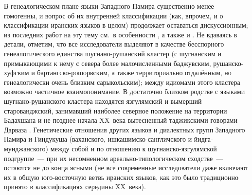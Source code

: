 В генеалогическом плане языки Западного Памира существенно менее гомогенны, и вопрос об их внутренней классификации (как, впрочем, и о классификации иранских языков в целом) продолжает оставаться дискуссионным; из последних работ на эту тему см.~в особенности \parencites{wendtland2009}{korn2016_tree}{korn2019}, а также \parencite{edelman_dodykhudoeva2009_shughni} и \parencite{edelman2021}. Не вдаваясь в детали, отметим, что все исследователи выделяют в качестве бесспорного генеалогического единства шугнано-рушанский кластер (с шугнанским и примыкающими к нему с севера более малочисленными баджувским, рушанско-хуфским и бартангско-рошорвским, а также территориально отдалённым, но генеалогически очень близким сарыкольским); между идиомами этого кластера возможно частичное взаимопонимание. В достаточно близком родстве с языками шугнано-рушанского кластера находятся язгулямский \parencite{sokolova1967} и вымерший старованджский, занимавший наиболее северное положение на территории Бадахшана и не позднее начала XX~века вытесненный таджикскими говорами Дарваза \parencite{lashkarbekov2008}. Генетические отношения других языков и диалектных групп Западного Памира и Гиндукуша (ваханского, ишкашимско-сангличского и йидга-мунджанского) между собой и по отношению к шугнанско-язгулямской подгруппе~— при их несомненном ареально-типологическом сходстве~— остаются не до конца ясными (не все современные исследователи даже включают их в общую юго-восточную ветвь иранских языков, как это было традиционно принято в классификациях середины XX~века).


